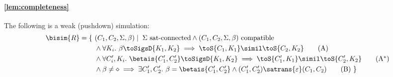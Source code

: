 \paragraph{\cref{lem:completeness}}
The following is a weak (pushdown) simulation:
  \begin{align}
    \bisim{R} = \{\ &(C_1,C_2,\Sigma,\beta) \mid\;
\Sigma\text{ sat-connected}\land
                 (C_1,C_2,\Sigma,\beta)\text{ compatible}\notag\\
                    &{}\land\forall K_i.\ \beta\toSigsD{K_1,K_2}
                      \implies
                                                \toS{C_1,K_1}\simil\toS{C_2,K_2}\tag{A}\label{app:completeness:cond:a}\\
              & {}\land\forall C_i',K_i.\  \betais{C'_1,C'_2}\toSigsD{K_1,K_2}
                \implies
                \toS{C_1',K_1}\simil\toS{C_2',K_2}\tag{A$^*$}\label{app:completeness:cond:a1}\\
              & {}\land\beta\neq\diamond\implies\exists C_1',C_2'.\ \beta=\betais{C_1',C_2'}\land 
 (C_1',C_2')\satrans{\varepsilon}(C_1,C_2)\tag{B}\label{app:completeness:cond:b}
\    \}
  \end{align}
